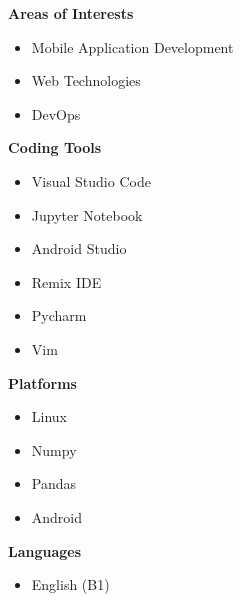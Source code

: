 \documentclass[a4paper,11pt]{article}
\begin{document}
\vspace{0.5em}
\noindent
\begin{minipage}[t]{0.48\textwidth}
    \textbf{Areas of Interests}
    \vspace{0.3em}
    \begin{itemize}[leftmargin=2em]
        \item Mobile Application Development
        \item Web Technologies

        \item DevOps
    \end{itemize}
\end{minipage}%
\hfill
\begin{minipage}[t]{0.48\textwidth}
    \textbf{Coding Tools}
    \vspace{0.3em}
    \begin{itemize}[leftmargin=2em]
        \item Visual Studio Code
        \item Jupyter Notebook
        \item Android Studio
        \item Remix IDE
        \item Pycharm
        \item Vim
    \end{itemize}
\end{minipage}


\vspace{0.5em}
\noindent
\begin{minipage}[t]{0.48\textwidth}
    \textbf{Platforms}
    \vspace{0.3em}
    \begin{itemize}[leftmargin=2em]
        \item Linux
        \item Numpy
        \item Pandas
        \item Android
    \end{itemize}
\end{minipage}%
\hfill
\begin{minipage}[t]{0.48\textwidth}
    \textbf{Languages}
    \vspace{0.3em}
    \begin{itemize}[leftmargin=2em]
        \item English (B1)
    \end{itemize}
\end{minipage}
\end{document}
